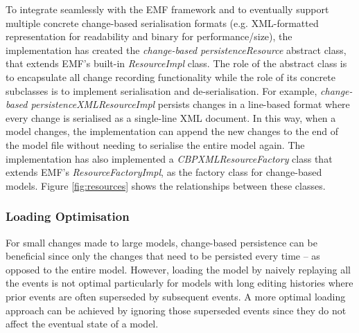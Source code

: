 \documentclass[12pt, a4paper]{report} \usepackage[titletoc]{appendix}
\begin{document}
To integrate seamlessly with the EMF framework and to eventually support multiple concrete change-based serialisation formats (e.g. XML-formatted representation for readability and binary for performance/size), the implementation has created the \emph{change-based persistenceResource} abstract class, that extends EMF's built-in \emph{ResourceImpl} class. The role of the abstract class is to encapsulate all change recording functionality while the role of its concrete subclasses is to implement serialisation and de-serialisation. For example, \emph{change-based persistenceXMLResourceImpl} persists changes in a line-based format where every change is serialised as a single-line XML document. In this way, when a model changes, the implementation can append the new changes to the end of the model file without needing to serialise the entire model again. The implementation has also implemented a \emph{CBPXMLResourceFactory} class that extends EMF's \emph{ResourceFactoryImpl}, as the factory class for change-based models. Figure \ref{fig:resources} shows the relationships between these classes.

\subsubsection{Loading Optimisation}
\label{loading_optimisation}
For small changes made to large models, change-based persistence can be beneficial since only the changes that need to be persisted every time -- as opposed to the entire model. However, loading the model by naively replaying all the events is not optimal particularly for models with long editing histories where prior events are often superseded by subsequent events. A more optimal loading approach can be achieved by ignoring those superseded events since they do not affect the eventual state of a model.
\end{document}

